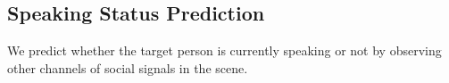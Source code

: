 






\subsection{Speaking Status Prediction}
We predict whether the target person is currently speaking or not by observing other channels of social signals in the scene. 

